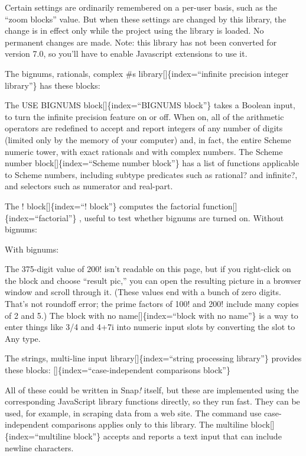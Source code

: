 \documentclass[
  letterpaper,
]{book}
\begin{document}
Certain settings are ordinarily remembered on a per-user basis, such as
the ``zoom blocks'' value. But when these settings are changed by this
library, the change is in effect only while the project using the
library is loaded. No permanent changes are made. Note: this library has
not been converted for version 7.0, so you'll have to enable Javascript
extensions to use it.

The bignums, rationals, complex \#s library{[}{]}\{index=``infinite
precision integer library''\} has these blocks:

The USE BIGNUMS block{[}{]}\{index=``BIGNUMS block''\} takes a Boolean
input, to turn the infinite precision feature on or off. When on, all of
the arithmetic operators are redefined to accept and report integers of
any number of digits (limited only by the memory of your computer) and,
in fact, the entire Scheme numeric tower, with exact rationals and with
complex numbers. The Scheme number block{[}{]}\{index=``Scheme number
block''\} has a list of functions applicable to Scheme numbers,
including subtype predicates such as rational? and infinite?, and
selectors such as numerator and real-part.

The ! block{[}{]}\{index=``! block''\} computes the factorial
function{[}{]}\{index=``factorial''\} , useful to test whether bignums
are turned on. Without bignums:

With bignums:

The 375-digit value of 200! isn't readable on this page, but if you
right-click on the block and choose ``result pic,'' you can open the
resulting picture in a browser window and scroll through it. (These
values end with a bunch of zero digits. That's not roundoff error; the
prime factors of 100! and 200! include many copies of 2 and 5.) The
block with no name{[}{]}\{index=``block with no name''\} is a way to
enter things like 3/4 and 4+7i into numeric input slots by converting
the slot to Any type.

The strings, multi-line input library{[}{]}\{index=``string processing
library''\} provides these blocks: {[}{]}\{index=``case-independent
comparisons block''\}

All of these could be written in Snap\emph{!} itself, but these are
implemented using the corresponding JavaScript library functions
directly, so they run fast. They can be used, for example, in scraping
data from a web site. The command use case-independent comparisons
applies only to this library. The multiline
block{[}{]}\{index=``multiline block''\} accepts and reports a text
input that can include newline characters.
\end{document}
